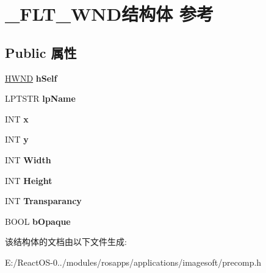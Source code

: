 \hypertarget{struct___f_l_t___w_n_d}{}\section{\+\_\+\+F\+L\+T\+\_\+\+W\+N\+D结构体 参考}
\label{struct___f_l_t___w_n_d}
\subsection*{Public 属性}
\begin{DoxyCompactItemize}
\item 
\mbox{\label{struct___f_l_t___w_n_d_ac3b58ed000cf8fd4106584f9a891e470}} 
\hyperlink{interfacevoid}{H\+W\+ND} {\bfseries h\+Self}
\item 
\mbox{\label{struct___f_l_t___w_n_d_ae13b9684d258e3d133fb3095ff238d78}} 
L\+P\+T\+S\+TR {\bfseries lp\+Name}
\item 
\mbox{\label{struct___f_l_t___w_n_d_a8dc64abaee3563d0d6bf036d6da7e7ac}} 
I\+NT {\bfseries x}
\item 
\mbox{\label{struct___f_l_t___w_n_d_a7a3a90cabf4b0a446a1871a20c14a1a7}} 
I\+NT {\bfseries y}
\item 
\mbox{\label{struct___f_l_t___w_n_d_abe2c96919d461002ab1c3dfeb0688390}} 
I\+NT {\bfseries Width}
\item 
\mbox{\label{struct___f_l_t___w_n_d_a6cf2479cb1f811dedf48dd8be1cecd07}} 
I\+NT {\bfseries Height}
\item 
\mbox{\label{struct___f_l_t___w_n_d_adb0f7b941bee419477ed6368d2bb91ce}} 
I\+NT {\bfseries Transparancy}
\item 
\mbox{\label{struct___f_l_t___w_n_d_aff366ec85dccb51a555f8869e3e2e7ff}} 
B\+O\+OL {\bfseries b\+Opaque}
\end{DoxyCompactItemize}


该结构体的文档由以下文件生成\+:\begin{DoxyCompactItemize}
\item 
E\+:/\+React\+O\+S-\/0../modules/rosapps/applications/imagesoft/precomp.\+h\end{DoxyCompactItemize}
